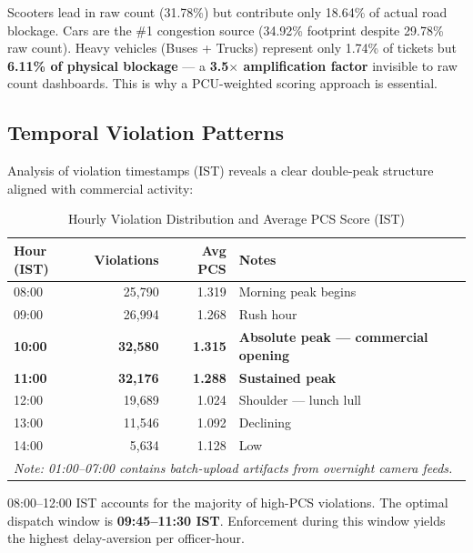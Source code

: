 \documentclass[12pt,a4paper]{article}
\begin{document}
\begin{tcolorbox}[resultbox, title={Key Finding: PCU Amplification Effect}]
Scooters lead in raw count (31.78\%) but contribute only 18.64\% of actual road blockage. Cars are the \#1 congestion source (34.92\% footprint despite 29.78\% raw count). Heavy vehicles (Buses + Trucks) represent only 1.74\% of tickets but \textbf{6.11\% of physical blockage} — a \textbf{3.5$\times$ amplification factor} invisible to raw count dashboards. This is why a PCU-weighted scoring approach is essential.
\end{tcolorbox}

\subsection{Temporal Violation Patterns}

Analysis of violation timestamps (IST) reveals a clear double-peak structure aligned with commercial activity:

\begin{table}[H]
\centering
\caption{Hourly Violation Distribution and Average PCS Score (IST)}
\begin{tabular}{lrrp{5cm}}
\toprule
\textbf{Hour (IST)} & \textbf{Violations} & \textbf{Avg PCS} & \textbf{Notes} \\
\midrule
08:00 & 25,790 & 1.319 & Morning peak begins \\
09:00 & 26,994 & 1.268 & Rush hour \\
\rowcolor{alertred!12} \textbf{10:00} & \textbf{32,580} & \textbf{1.315} & \textbf{Absolute peak — commercial opening} \\
\rowcolor{alertred!12} \textbf{11:00} & \textbf{32,176} & \textbf{1.288} & \textbf{Sustained peak} \\
12:00 & 19,689 & 1.024 & Shoulder — lunch lull \\
13:00 & 11,546 & 1.092 & Declining \\
14:00 & 5,634 & 1.128 & Low \\
\midrule
\multicolumn{4}{l}{\textit{Note: 01:00–07:00 contains batch-upload artifacts from overnight camera feeds.}} \\
\bottomrule
\end{tabular}
\end{table}

\begin{tcolorbox}[keybox, title={Operational Dispatch Window}]
08:00--12:00 IST accounts for the majority of high-PCS violations. The optimal dispatch window is \textbf{09:45--11:30 IST}. Enforcement during this window yields the highest delay-aversion per officer-hour.
\end{tcolorbox}
\end{document}
